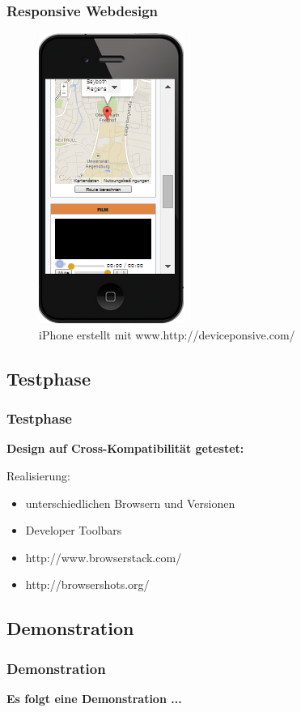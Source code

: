 \begin{frame}
  \frametitle{Responsive Webdesign}
\begin{figure}[!htbp]
 \centering
 \includegraphics[scale=0.5]{./Source/Iphone2.PNG}
 \caption{iPhone erstellt mit www.http://deviceponsive.com/}

\end{figure}
\end{frame}

\subsection{Testphase}
\begin{frame} %
\frametitle{Testphase} %
  \textbf{Design auf Cross-Kompatibilität getestet: }
  \begin{block}{Realisierung:}
	 \begin{itemize}

	\item unterschiedlichen Browsern und Versionen
	\item Developer Toolbars
	\item http://www.browserstack.com/
	\item http://browsershots.org/
 \end{itemize}
\end{block}


\end{frame}







\subsection{Demonstration}
\begin{frame} %
  \frametitle{Demonstration} %

  \center
  \textbf{Es folgt eine Demonstration ...}
\end{frame}